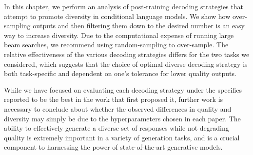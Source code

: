In this chapter, we perform an analysis of post-training decoding strategies that attempt to promote diversity in conditional language models. We show how over-sampling outputs and then filtering them down to the desired number is an easy way to increase diversity. Due to the computational expense of running large beam searches, we recommend using random-sampling to over-sample. The relative effectiveness of the various decoding strategies differs for the two tasks we considered, which suggests that the choice of optimal diverse decoding strategy is both task-specific and dependent on one's tolerance for lower quality outputs.

While we have focused on evaluating each decoding strategy under the specifics reported to be the best in the work that first proposed it, further work is necessary to conclude about whether the observed differences in quality and diversity may simply be due to the hyperparameters chosen in each paper. The ability to effectively generate a diverse set of responses while not degrading quality is extremely important in a variety of generation tasks, and is a crucial component to harnessing the power of state-of-the-art generative models.